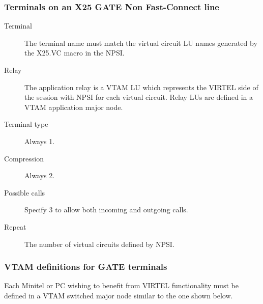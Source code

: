 \documentclass[letterpaper,10pt,english]{sphinxmanual}
\begin{document}
\subsubsection{Terminals on an X25 GATE Non Fast-Connect line}
\label{\detokenize{connectivity_guide:terminals-on-an-x25-gate-non-fast-connect-line}}\begin{description}
\item[{Terminal}] \leavevmode
The terminal name must match the virtual circuit LU names generated by the X25.VC macro in the NPSI.

\item[{Relay}] \leavevmode
The application relay is a VTAM LU which represents the VIRTEL side of the session with NPSI for each virtual circuit. Relay LUs are defined in a VTAM application major node.

\item[{Terminal type}] \leavevmode
Always 1.

\item[{Compression}] \leavevmode
Always 2.

\item[{Possible calls}] \leavevmode
Specify 3 to allow both incoming and outgoing calls.

\item[{Repeat}] \leavevmode
The number of virtual circuits defined by NPSI.

\end{description}


\subsubsection{VTAM definitions for GATE terminals}
\label{\detokenize{connectivity_guide:vtam-definitions-for-gate-terminals}}
Each Minitel or PC wishing to benefit from VIRTEL functionality must be defined in a VTAM switched major node similar to the one shown below.
\end{document}
